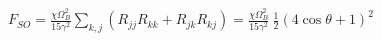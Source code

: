 $\displaystyle
F_{SO} = \frac{\chi\Omega_B^2}{15\gamma^2} \sum_{k,j}(R_{jj}R_{kk} + R_{jk}R_{kj})
       = \frac{\chi\Omega_B^2}{15\gamma^2}\ \frac12(4\cos\theta+1)^2
$
